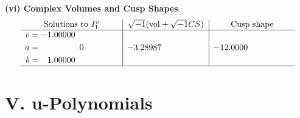 \documentclass[1p]{elsarticle_modified}
\theoremstyle{definition}
\newcommand{\I}{\sqrt{-1}}
\begin{document}
\newpage\flushleft \textbf{(vi) Complex Volumes and Cusp Shapes}
$$\begin{array}{c|c|c}  
\text{Solutions to }I^v_{1}& \I (\text{vol} + \sqrt{-1}CS) & \text{Cusp shape}\\
 \hline 
\begin{aligned}
v &= -1.00000\phantom{ +0.000000I} \\
a &= \phantom{-0.000000 } 0 \\
b &= \phantom{-}1.00000\phantom{ +0.000000I}\end{aligned}
 & -3.28987\phantom{ +0.000000I} & -12.0000\phantom{ +0.000000I}\\
 \hline 
 \end{array}$$\newpage
\newpage\renewcommand{\arraystretch}{1}
\centering \section*{ V. u-Polynomials}
\end{document}
